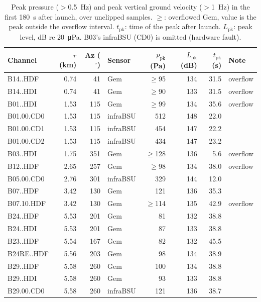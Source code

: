 \begin{table}[p]
  \centering
  \caption{Peak pressure ($>$0.5~Hz) and peak vertical ground velocity ($>$1~Hz) in the first 180~s after launch, over unclipped samples. $\geq$: overflowed Gem, value is the peak outside the overflow interval. $t_\text{pk}$: time of the peak after launch. $L_\text{pk}$: peak level, dB re \SI{20}{\micro\pascal}. B03's infraBSU (CD0) is omitted (hardware fault).}
  \label{tab:amplitudes}
  \scriptsize
  \begin{tabular}{lrrlrrrl}
  \toprule
  Channel & $r$ (km) & Az ($^{\circ}$) & Sensor & $p_\text{pk}$ (Pa) & $L_\text{pk}$ (dB) & $t_\text{pk}$ (s) & Note \\
  \midrule
  B14..HDF & 0.74 & 41 & Gem & $\geq$95 & 134 & 31.5 & overflow \\
  B14..HDI & 0.74 & 41 & Gem & $\geq$90 & 133 & 31.5 & overflow \\
  B01..HDI & 1.53 & 115 & Gem & $\geq$99 & 134 & 35.6 & overflow \\
  B01.00.CD0 & 1.53 & 115 & infraBSU & 512 & 148 & 22.0 &  \\
  B01.00.CD1 & 1.53 & 115 & infraBSU & 454 & 147 & 22.2 &  \\
  B01.00.CD2 & 1.53 & 115 & infraBSU & 434 & 147 & 23.2 &  \\
  B03..HDI & 1.75 & 351 & Gem & $\geq$128 & 136 & 5.6 & overflow \\
  B12..HDF & 2.65 & 257 & Gem & $\geq$98 & 134 & 38.0 & overflow \\
  B05.00.CD0 & 2.76 & 301 & infraBSU & 329 & 144 & 12.0 &  \\
  B07..HDF & 3.42 & 130 & Gem & 121 & 136 & 35.3 &  \\
  B07.10.HDF & 3.42 & 130 & Gem & $\geq$114 & 135 & 42.9 & overflow \\
  B24..HDF & 5.53 & 201 & Gem & 81 & 132 & 38.8 &  \\
  B24..HDI & 5.53 & 201 & Gem & 87 & 133 & 38.8 &  \\
  B23..HDF & 5.54 & 167 & Gem & 82 & 132 & 45.5 &  \\
  B24RE..HDF & 5.56 & 203 & Gem & 98 & 134 & 38.9 &  \\
  B29..HDF & 5.58 & 260 & Gem & 100 & 134 & 38.8 &  \\
  B29..HDI & 5.58 & 260 & Gem & 93 & 133 & 38.8 &  \\
  B29.00.CD0 & 5.58 & 260 & infraBSU & 121 & 136 & 38.7 &  \\

\end{tabular}
\end{table}
